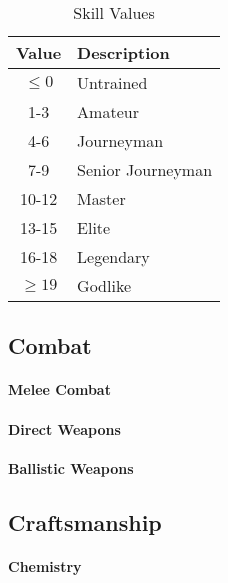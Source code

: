 \begin{table}[htb]
    \caption[Skill Values]{Skill Values}
    \label{tab:skill values}
    \centering
    \begin{tabular}{cl}
        \toprule
        \textbf{Value} & \textbf{Description} \\
        \midrule
        $\le 0$        & Untrained            \\
        1-3            & Amateur              \\
        4-6            & Journeyman           \\
        7-9            & Senior Journeyman    \\
        10-12          & Master               \\
        13-15          & Elite                \\
        16-18          & Legendary            \\
        $\ge 19$       & Godlike              \\
        \bottomrule
    \end{tabular}
\end{table}

\subsection{Combat}

\paragraph{Melee Combat}

\paragraph{Direct Weapons}

\paragraph{Ballistic Weapons}


\subsection{Craftsmanship}

\paragraph{Chemistry}

